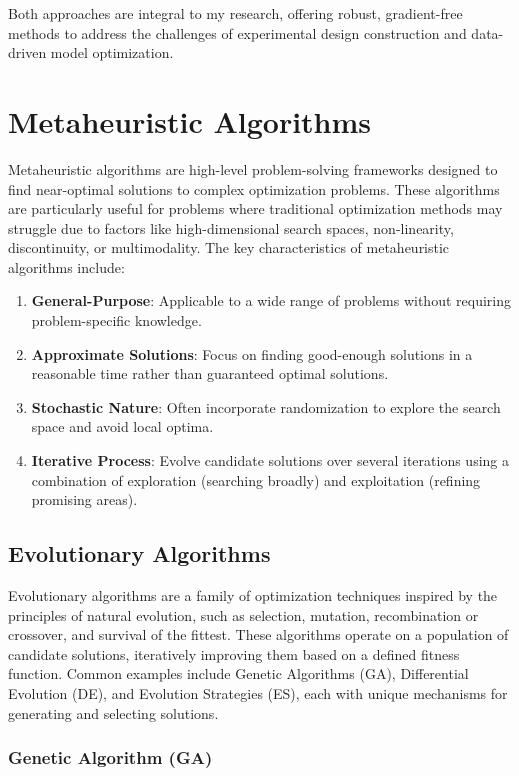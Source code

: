 Both approaches are integral to my research, offering robust, gradient-free methods to address the challenges of experimental design construction and data-driven model optimization.

\section{Metaheuristic Algorithms}

Metaheuristic algorithms are high-level problem-solving frameworks designed to find near-optimal solutions to complex optimization problems. These algorithms are particularly useful for problems where traditional optimization methods may struggle due to factors like high-dimensional search spaces, non-linearity, discontinuity, or multimodality. The key characteristics of metaheuristic algorithms include:
\begin{enumerate}
   \item \textbf{General-Purpose}: Applicable to a wide range of problems without requiring problem-specific knowledge.
   \item \textbf{Approximate Solutions}: Focus on finding good-enough solutions in a reasonable time rather than guaranteed optimal solutions.
   \item \textbf{Stochastic Nature}: Often incorporate randomization to explore the search space and avoid local optima.
   \item \textbf{Iterative Process}: Evolve candidate solutions over several iterations using a combination of exploration (searching broadly) and exploitation (refining promising areas).
\end{enumerate}

\subsection{Evolutionary Algorithms}
Evolutionary algorithms are a family of optimization techniques inspired by the principles of natural evolution, such as selection, mutation, recombination or crossover, and survival of the fittest. These algorithms operate on a population of candidate solutions, iteratively improving them based on a defined fitness function. Common examples include Genetic Algorithms (GA), Differential Evolution (DE), and Evolution Strategies (ES), each with unique mechanisms for generating and selecting solutions. 

\subsubsection{Genetic Algorithm (GA)}

